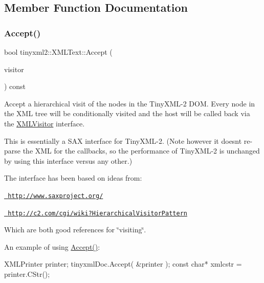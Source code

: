 \subsection{Member Function Documentation}
\mbox{\label{classtinyxml2_1_1_x_m_l_text_a537c60d7e18fb59c45ac2737a29ac47a}} 
\subsubsection{\texorpdfstring{Accept()}{Accept()}}
{\footnotesize\ttfamily bool tinyxml2\+::\+X\+M\+L\+Text\+::\+Accept (\begin{DoxyParamCaption}\item[{\mbox{\hyperlink{classtinyxml2_1_1_x_m_l_visitor}{X\+M\+L\+Visitor}} $\ast$}]{visitor }\end{DoxyParamCaption}) const\hspace{0.3cm}{\ttfamily [virtual]}}

Accept a hierarchical visit of the nodes in the Tiny\+X\+M\+L-\/2 D\+OM. Every node in the X\+ML tree will be conditionally visited and the host will be called back via the \mbox{\hyperlink{classtinyxml2_1_1_x_m_l_visitor}{X\+M\+L\+Visitor}} interface.

This is essentially a S\+AX interface for Tiny\+X\+M\+L-\/2. (Note however it doesn\textquotesingle{}t re-\/parse the X\+ML for the callbacks, so the performance of Tiny\+X\+M\+L-\/2 is unchanged by using this interface versus any other.)

The interface has been based on ideas from\+:


\begin{DoxyItemize}
\item \href{http://www.saxproject.org/}{\texttt{ http\+://www.\+saxproject.\+org/}}
\item \href{http://c2.com/cgi/wiki?HierarchicalVisitorPattern}{\texttt{ http\+://c2.\+com/cgi/wiki?\+Hierarchical\+Visitor\+Pattern}}
\end{DoxyItemize}

Which are both good references for \char`\"{}visiting\char`\"{}.

An example of using \mbox{\hyperlink{classtinyxml2_1_1_x_m_l_text_a537c60d7e18fb59c45ac2737a29ac47a}{Accept()}}\+: \begin{DoxyVerb}XMLPrinter printer;
tinyxmlDoc.Accept( &printer );
const char* xmlcstr = printer.CStr();
\end{DoxyVerb}
 

